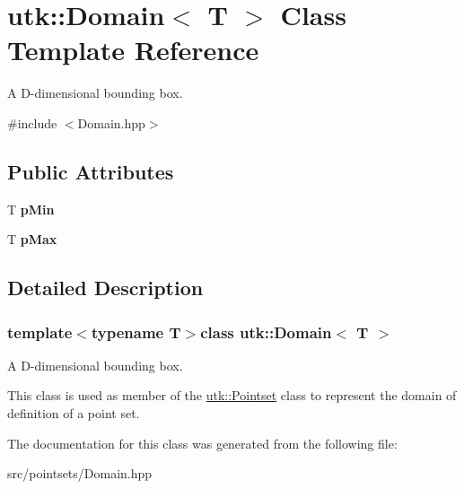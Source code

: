 \hypertarget{structutk_1_1Domain}{\section{utk\-:\-:Domain$<$ T $>$ Class Template Reference}
\label{structutk_1_1Domain}
}


A D-\/dimensional bounding box.  




{\ttfamily \#include $<$Domain.\-hpp$>$}

\subsection*{Public Attributes}
\begin{DoxyCompactItemize}
\item 
\hypertarget{structutk_1_1Domain_a7ab5becafbaf28118359da765a690b42}{T {\bfseries p\-Min}}\label{structutk_1_1Domain_a7ab5becafbaf28118359da765a690b42}

\item 
\hypertarget{structutk_1_1Domain_a1b3d0fa18c4b43ffb441dcdf7a6aa9ad}{T {\bfseries p\-Max}}\label{structutk_1_1Domain_a1b3d0fa18c4b43ffb441dcdf7a6aa9ad}

\end{DoxyCompactItemize}


\subsection{Detailed Description}
\subsubsection*{template$<$typename T$>$class utk\-::\-Domain$<$ T $>$}

A D-\/dimensional bounding box. 

This class is used as member of the \hyperlink{classutk_1_1Pointset}{utk\-::\-Pointset} class to represent the domain of definition of a point set. 

The documentation for this class was generated from the following file\-:\begin{DoxyCompactItemize}
\item 
src/pointsets/Domain.\-hpp\end{DoxyCompactItemize}
